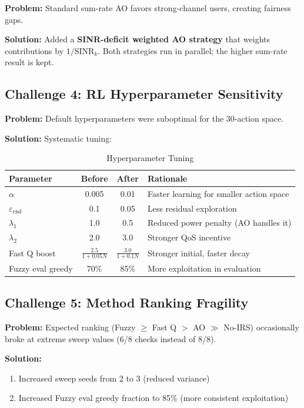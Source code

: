 \documentclass[11pt,a4paper]{article}
\begin{document}
\textbf{Problem:} Standard sum-rate AO favors strong-channel users, creating fairness gaps.

\textbf{Solution:} Added a \textbf{SINR-deficit weighted AO strategy} that weights contributions by $1/\mathrm{SINR}_k$. Both strategies run in parallel; the higher sum-rate result is kept.

\subsection{Challenge 4: RL Hyperparameter Sensitivity}

\textbf{Problem:} Default hyperparameters were suboptimal for the 30-action space.

\textbf{Solution:} Systematic tuning:

\begin{table}[H]
\centering
\caption{Hyperparameter Tuning}
\begin{tabular}{lccp{5.5cm}}
\toprule
\textbf{Parameter} & \textbf{Before} & \textbf{After} & \textbf{Rationale} \\
\midrule
$\alpha$ & 0.005 & 0.01 & Faster learning for smaller action space \\
$\varepsilon_{\mathrm{end}}$ & 0.1 & 0.05 & Less residual exploration \\
$\lambda_1$ & 1.0 & 0.5 & Reduced power penalty (AO handles it) \\
$\lambda_2$ & 2.0 & 3.0 & Stronger QoS incentive \\
Fast Q boost & $\frac{2.5}{1+0.05N}$ & $\frac{3.0}{1+0.1N}$ & Stronger initial, faster decay \\
Fuzzy eval greedy & 70\% & 85\% & More exploitation in evaluation \\
\bottomrule
\end{tabular}
\end{table}

\subsection{Challenge 5: Method Ranking Fragility}

\textbf{Problem:} Expected ranking (Fuzzy $\geq$ Fast Q $>$ AO $\gg$ No-IRS) occasionally broke at extreme sweep values (6/8 checks instead of 8/8).

\textbf{Solution:}
\begin{enumerate}[nosep]
    \item Increased sweep seeds from 2 to 3 (reduced variance)
    \item Increased Fuzzy eval greedy fraction to 85\% (more consistent exploitation)
\end{enumerate}
\end{document}
